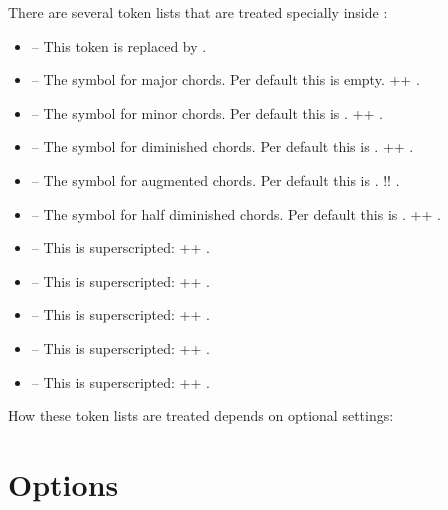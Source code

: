 \documentclass[load-preamble+]{cnltx-doc}
\begin{document}
There are several token lists that are treated specially inside :
\begin{itemize}
  \item \code{\^{}} -- This token is replaced by .
  \item {} -- The symbol for major chords.  Per default this is
    empty. \verbcode++ .
  \item {} -- The symbol for minor chords.  Per default this is
    .  \verbcode++ .
  \item {} -- The symbol for diminished chords.  Per default this is
    .  \verbcode++
    .
  \item \code{+} -- The symbol for augmented chords.  Per default this is
    .  \verbcode!!
    .
  \item {} -- The symbol for half diminished chords.  Per default
    this is .
    \verbcode++ .
  \item {} -- This is superscripted: \verbcode++
    .
  \item {} -- This is superscripted: \verbcode++
    .
  \item {} -- This is superscripted: \verbcode++
    .
  \item {} -- This is superscripted: \verbcode++
    .
  \item {} -- This is superscripted: \verbcode++
    .
\end{itemize}

How these token lists are treated depends on optional settings:

\begin{example}
   
   
\end{example}

\section{Options}
\end{document}
